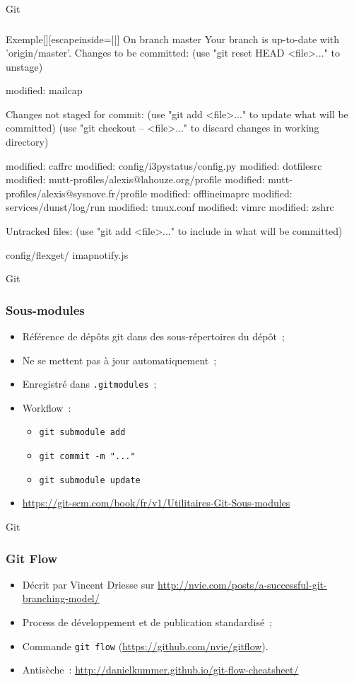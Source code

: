 \begin{frame}[fragile]{Git}
\frametitle{}
\begin{snvlisting}{Exemple}[][escapeinside=||]
On branch master
Your branch is up-to-date with 'origin/master'.
Changes to be committed:
  (use "git reset HEAD <file>..." to unstage)

        modified:   mailcap

Changes not staged for commit:
  (use "git add <file>..." to update what will be committed)
  (use "git checkout -- <file>..." to discard changes in working directory)

        modified:   caffrc
        modified:   config/i3pystatus/config.py
        modified:   dotfilesrc
        modified:   mutt-profiles/alexis@lahouze.org/profile
        modified:   mutt-profiles/alexis@sysnove.fr/profile
        modified:   offlineimaprc
        modified:   services/dunst/log/run
        modified:   tmux.conf
        modified:   vimrc
        modified:   zshrc

Untracked files:
  (use "git add <file>..." to include in what will be committed)

        config/flexget/
        imapnotify.js

\end{snvlisting}
\end{frame}

\begin{frame}[fragile]{Git}
\frametitle{Sous-modules}
\begin{itemize}[<+->]
 \item Référence de dépôts git dans des sous-répertoires du dépôt~;
 \item Ne se mettent pas à jour automatiquement~;
 \item Enregistré dans \verb/.gitmodules/~;
 \item Workflow~:
 \begin{itemize}[<+->]
  \item \verb/git submodule add/
  \item \verb/git commit -m "..."/
  \item \verb/git submodule update/
 \end{itemize}
 \item \url{https://git-scm.com/book/fr/v1/Utilitaires-Git-Sous-modules}
\end{itemize}
\end{frame}

\begin{frame}[fragile]{Git}
 \frametitle{Git Flow}
 \begin{itemize}[<+->]
  \item Décrit par Vincent Driesse sur \url{http://nvie.com/posts/a-successful-git-branching-model/}
  \item Process de développement et de publication standardisé~;
  \item Commande \verb/git flow/ (\url{https://github.com/nvie/gitflow}).
  \item Antisèche~: \url{http://danielkummer.github.io/git-flow-cheatsheet/}
 \end{itemize}
\end{frame}

